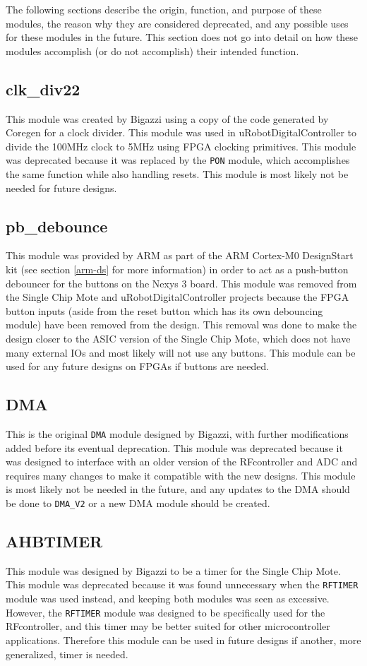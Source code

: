 The following sections describe the origin, function, and purpose of these modules, the reason why they are considered deprecated, and any possible uses for these modules in the future. This section does not go into detail on how these modules accomplish (or do not accomplish) their intended function.

\subsection{clk\_div22}
This module was created by Bigazzi using a copy of the code generated by Coregen for a clock divider. This module was used in uRobotDigitalController to divide the 100MHz clock to 5MHz using FPGA clocking primitives. This module was deprecated because it was replaced by the \texttt{PON} module, which accomplishes the same function while also handling resets. This module is most likely not be needed for future designs.

\subsection{pb\_debounce}
This module was provided by ARM as part of the ARM Cortex-M0 DesignStart kit (see section \ref{arm-ds} for more information) in order to act as a push-button debouncer for the buttons on the Nexys 3 board. This module was removed from the Single Chip Mote and uRobotDigitalController projects because the FPGA button inputs (aside from the reset button which has its own debouncing module) have been removed from the design. This removal was done to make the design closer to the ASIC version of the Single Chip Mote, which does not have many external IOs and most likely will not use any buttons. This module can be used for any future designs on FPGAs if buttons are needed.

\subsection{DMA}
This is the original \texttt{DMA} module designed by Bigazzi, with further modifications added before its eventual deprecation. This module was deprecated because it was designed to interface with an older version of the RFcontroller and ADC and requires many changes to make it compatible with the new designs. This module is most likely not be needed in the future, and any updates to the DMA should be done to \texttt{DMA\_V2} or a new DMA module should be created.

\subsection{AHBTIMER}
This module was designed by Bigazzi to be a timer for the Single Chip Mote. This module was deprecated because it was found unnecessary when the \texttt{RFTIMER} module was used instead, and keeping both modules was seen as excessive. However, the \texttt{RFTIMER} module was designed to be specifically used for the RFcontroller, and this timer may be better suited for other microcontroller applications. Therefore this module can be used in future designs if another, more generalized, timer is needed.

